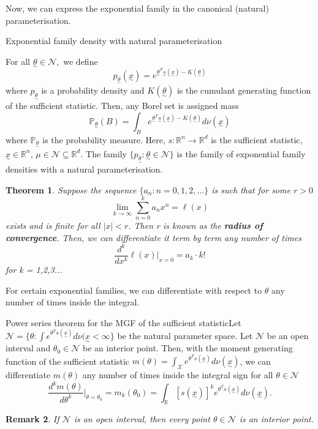 \documentclass[twoside]{article}
\newcounter{lecnum}
\newtheorem{theorem}{Theorem}[lecnum]
\newtheorem{remark}[theorem]{Remark}
\newcommand{\prob}{\mathbb{P}}
\newcommand{\utilde}{\underset{\sim}}
\begin{document}
Now, we can express the exponential family in the canonical (natural) parameterisation.

\begin{definition_exam}{Exponential family density with natural parameterisation}{}

For all $\utilde{\theta} \in \mathcal{N},$ we define
$$
p_{\utilde{\theta}}(\utilde{x}) = e^{\utilde{\theta}^T\utilde{s}(\utilde{x}) - K(\utilde{\theta})}
$$
where $p_{\utilde{\theta}}$ is a probability density and $K(\utilde{\theta})$ is the cumulant generating function of the sufficient statistic. Then, any Borel set is assigned mass 
$$
\prob_{\utilde{\theta}}(B) = \int_{B}e^{\utilde{\theta}^T\utilde{s}(\utilde{x}) - K(\utilde{\theta})}d\nu(\utilde{x})
$$
where $\prob_{\utilde{\theta}}$ is the probability measure. Here, $s: \mathbb{R}^n \rightarrow \mathbb{R}^d$ is the sufficient statistic, $\utilde{x} \in \mathbb{R}^n$, $\mu \in \mathcal{N} \subseteq \mathbb{R}^d.$ The family $\{p_{\utilde{\theta}}: \utilde{\theta} \in \mathcal{N}\}$ is the family of exponential family densities with a natural parameterisation.
\end{definition_exam}

\begin{theorem}Suppose the sequence $\{a_n: n=0,1,2,...\}$ is such that for some $r > 0$
$$
\lim_{k \rightarrow \infty}\sum_{n=0}^{k}a_nx^n = \ell(x)
$$
exists and is finite for all $|x| < r$. Then r is known as the \textbf{radius of convergence}. Then, we can differentiate it term by term any number of times 
$$
\frac{d^k}{dx^k}\ell(x)|_{x = 0} = a_k \cdot k!
$$
for k = 1,2,3...
\end{theorem}


For certain exponential families, we can differentiate with respect to $\theta$ any number of times inside the integral.

\begin{theorem_exam}{Power series theorem for the MGF of the sufficient statistic}{}Let $\mathcal{N} = \{\theta: \int e^{\theta^Ts(\utilde{x})}d\nu(\utilde{x} < \infty\}$ be the natural parameter space. Let $\mathcal{N}$ be an open interval and $\theta_0 \in \mathcal{N}$ be an interior point. Then, with the moment generating function of the sufficient statistic $m(\theta) = \int_{\mathcal{X}}e^{\theta^Ts(\utilde{x})}d\nu(\utilde{x})$, we can differentiate $m(\theta)$ any number of times inside the integral sign for all $\theta \in \mathcal{N}$
$$
\frac{d^km(\theta)}{d\theta^k}|_{\theta = \theta_0} = m_k(\theta_0) = \int_{\mathbb{R}}[s(\utilde{x})]^ke^{\theta^Ts(\utilde{x})}d\nu(\utilde{x}).
$$
\end{theorem_exam}
\begin{remark}If $\mathcal{N}$ is an open interval, then every point $\theta \in \mathcal{N}$ is an interior point.
\end{remark}
\end{document}
